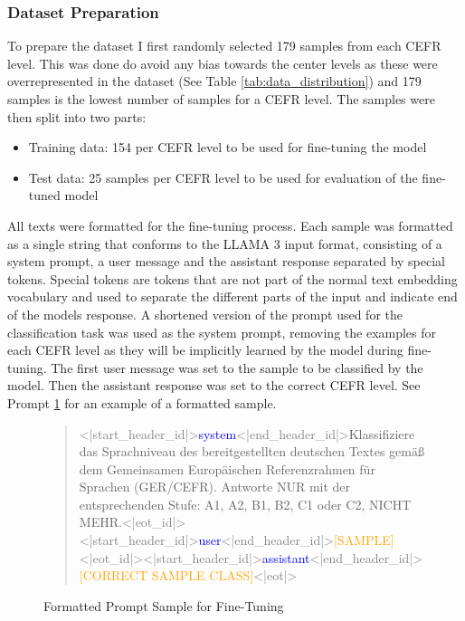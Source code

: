 \subsubsection{Dataset Preparation}
\label{sss:dataset_preparation}
To prepare the dataset I first randomly selected 179 samples from each CEFR level. This was done do avoid any bias towards the center levels as these were overrepresented in the dataset (See Table \ref{tab:data_distribution}) and 179 samples is the lowest number of samples for a CEFR level. The samples were then split into two parts:
\begin{itemize}
    \item Training data: 154 per CEFR level to be used for fine-tuning the model
    \item Test data: 25 samples per CEFR level to be used for evaluation of the fine-tuned model
\end{itemize}
All texts were formatted for the fine-tuning process. Each sample was formatted as a single string that conforms to the LLAMA 3 input format, consisting of a system prompt, a user message and the assistant response separated by special tokens. 
Special tokens are tokens that are not part of the normal text embedding vocabulary and used to separate the different parts of the input and indicate end of the models response. A shortened version of the prompt used for the classification task was used as the system prompt, removing the examples for each CEFR level as they will be implicitly learned by the model during fine-tuning. The first user message was set to the sample to be classified by the model. Then the assistant response was set to the correct CEFR level. See Prompt \ref{qu:formatted_sample} for an example of a formatted sample.

\captionsetup{labelformat=prompt}
\begin{figure}
    \begin{quotation}
        \textcolor{gray}{<|start\_header\_id|>}\textcolor{blue}{system}\textcolor{gray}{<|end\_header\_id|>}Klassifiziere das Sprachniveau des bereitgestellten deutschen Textes gemäß dem Gemeinsamen Europäischen Referenzrahmen für Sprachen (GER/CEFR). Antworte NUR mit der entsprechenden Stufe: A1, A2, B1, B2, C1 oder C2, NICHT MEHR.\textcolor{gray}{<|eot\_id|>}\textcolor{gray}{<|start\_header\_id|>}\textcolor{blue}{user}\textcolor{gray}{<|end\_header\_id|>}\textcolor{orange}{[SAMPLE]}
        \textcolor{gray}{<|eot\_id|>}\textcolor{gray}{<|start\_header\_id|>}\textcolor{blue}{assistant}\textcolor{gray}{<|end\_header\_id|>}\textcolor{orange}{[CORRECT SAMPLE CLASS]}\textcolor{gray}{<|eot|>}
    \end{quotation}
    \caption{Formatted Prompt Sample for Fine-Tuning}
    \label{qu:formatted_sample}
\end{figure}
\captionsetup{labelformat=default}

